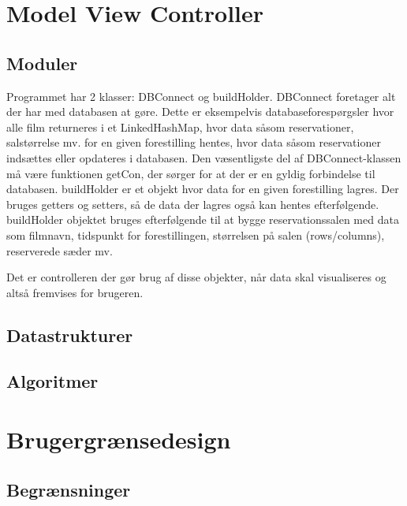 \documentclass[final]{rapport1}
\begin{document}
\section{Model View Controller}

\subsection{Moduler}
Programmet har 2 klasser: DBConnect og buildHolder.
DBConnect foretager alt der har med databasen at gøre. Dette er eksempelvis databaseforespørgsler hvor alle film returneres i et LinkedHashMap, hvor data såsom reservationer, salstørrelse mv. for en given forestilling hentes, hvor data såsom reservationer indsættes eller opdateres i databasen. Den væsentligste del af DBConnect-klassen må være funktionen getCon, der sørger for at der er en gyldig forbindelse til databasen. 
buildHolder er et objekt hvor data for en given forestilling lagres. Der bruges getters og setters, så de data der lagres også kan hentes efterfølgende. buildHolder objektet bruges efterfølgende til at bygge reservationssalen med data som filmnavn, tidspunkt for forestillingen, størrelsen på salen (rows/columns), reserverede sæder mv. 

Det er controlleren der gør brug af disse objekter, når data skal visualiseres og altså fremvises for brugeren.

\subsection{Datastrukturer}

\subsection{Algoritmer}

\section{Brugergrænsedesign}




\subsection{Begrænsninger}
\end{document}
